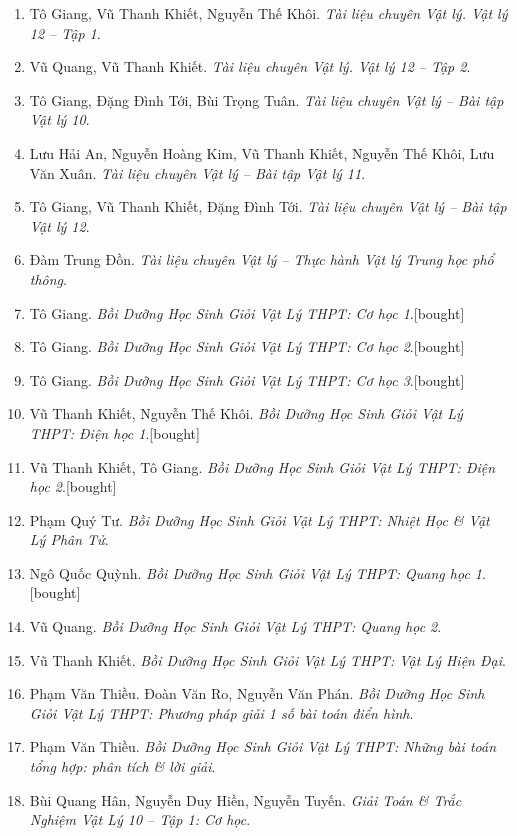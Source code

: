 \documentclass{article}
\begin{document}
\begin{enumerate}	
	\item Tô Giang, Vũ Thanh Khiết, Nguyễn Thế Khôi. \textit{Tài liệu chuyên Vật lý. Vật lý 12 -- Tập 1}.
	\item Vũ Quang, Vũ Thanh Khiết. \textit{Tài liệu chuyên Vật lý. Vật lý 12 -- Tập 2}.
	\item Tô Giang, Đặng Đình Tới, Bùi Trọng Tuân. \textit{Tài liệu chuyên Vật lý -- Bài tập Vật lý 10}.
	\item Lưu Hải An, Nguyễn Hoàng Kim, Vũ Thanh Khiết, Nguyễn Thế Khôi, Lưu Văn Xuân. \textit{Tài liệu chuyên Vật lý -- Bài tập Vật lý 11}.
	\item Tô Giang, Vũ Thanh Khiết, Đặng Đình Tới. \textit{Tài liệu chuyên Vật lý -- Bài tập Vật lý 12}.
	\item Đàm Trung Đồn. \textit{Tài liệu chuyên Vật lý -- Thực hành Vật lý Trung học phổ thông}.
	\item Tô Giang. \textit{Bồi Dưỡng Học Sinh Giỏi Vật Lý THPT: Cơ học 1}.\hfill\textsf{[bought]}
	\item Tô Giang. \textit{Bồi Dưỡng Học Sinh Giỏi Vật Lý THPT: Cơ học 2}.\hfill\textsf{[bought]}
	\item Tô Giang. \textit{Bồi Dưỡng Học Sinh Giỏi Vật Lý THPT: Cơ học 3}.\hfill\textsf{[bought]}
	\item Vũ Thanh Khiết, Nguyễn Thế Khôi. \textit{Bồi Dưỡng Học Sinh Giỏi Vật Lý THPT: Điện học 1}.\hfill\textsf{[bought]}
	\item Vũ Thanh Khiết, Tô Giang. \textit{Bồi Dưỡng Học Sinh Giỏi Vật Lý THPT: Điện học 2}.\hfill\textsf{[bought]}
	\item Phạm Quý Tư. \textit{Bồi Dưỡng Học Sinh Giỏi Vật Lý THPT: Nhiệt Học \& Vật Lý Phân Tử}.
	\item Ngô Quốc Quỳnh. \textit{Bồi Dưỡng Học Sinh Giỏi Vật Lý THPT: Quang học 1}.\hfill\textsf{[bought]}
	\item Vũ Quang. \textit{Bồi Dưỡng Học Sinh Giỏi Vật Lý THPT: Quang học 2}.
	\item Vũ Thanh Khiết. \textit{Bồi Dưỡng Học Sinh Giỏi Vật Lý THPT: Vật Lý Hiện Đại}.
	\item Phạm Văn Thiều. Đoàn Văn Ro, Nguyễn Văn Phán. \textit{Bồi Dưỡng Học Sinh Giỏi Vật Lý THPT: Phương pháp giải 1 số bài toán điển hình}.
	\item Phạm Văn Thiều. \textit{Bồi Dưỡng Học Sinh Giỏi Vật Lý THPT: Những bài toán tổng hợp: phân tích \& lời giải}.
	\item Bùi Quang Hân, Nguyễn Duy Hiền, Nguyễn Tuyến. \textit{Giải Toán \& Trắc Nghiệm Vật Lý 10 -- Tập 1: Cơ học}.

\end{enumerate}
\end{document}
